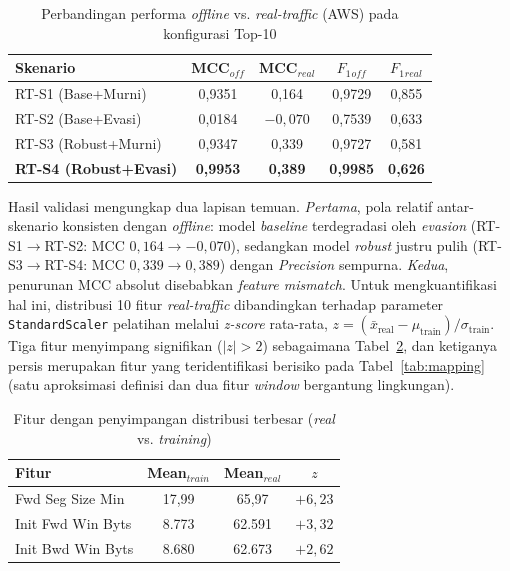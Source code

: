 \documentclass[10pt,twocolumn,a4paper]{extarticle}
\begin{document}
\begin{table}[htbp]
\caption{Perbandingan performa \textit{offline} vs. \textit{real-traffic} (AWS) pada konfigurasi Top-10}
\label{tab:real_traffic_results}
\centering
\footnotesize
\begin{tabularx}{\linewidth}{@{} X c c c c @{}}
\toprule
\textbf{Skenario} & \textbf{MCC$_{off}$} & \textbf{MCC$_{real}$} & \textbf{$F_1{}_{off}$} & \textbf{$F_1{}_{real}$} \\ \midrule
RT-S1 (Base+Murni) & 0,9351 & 0,164 & 0,9729 & 0,855 \\
RT-S2 (Base+Evasi) & 0,0184 & $-0{,}070$ & 0,7539 & 0,633 \\
RT-S3 (Robust+Murni) & 0,9347 & 0,339 & 0,9727 & 0,581 \\
\textbf{RT-S4 (Robust+Evasi)} & \textbf{0,9953} & \textbf{0,389} & \textbf{0,9985} & \textbf{0,626} \\ \bottomrule
\end{tabularx}
\end{table}

Hasil validasi mengungkap dua lapisan temuan. \textit{Pertama}, pola relatif antar-skenario konsisten dengan \textit{offline}: model \textit{baseline} terdegradasi oleh \textit{evasion} (RT-S1$\rightarrow$RT-S2: MCC $0{,}164 \rightarrow -0{,}070$), sedangkan model \textit{robust} justru pulih (RT-S3$\rightarrow$RT-S4: MCC $0{,}339 \rightarrow 0{,}389$) dengan \textit{Precision} sempurna. \textit{Kedua}, penurunan MCC absolut disebabkan \textit{feature mismatch}. Untuk mengkuantifikasi hal ini, distribusi 10 fitur \textit{real-traffic} dibandingkan terhadap parameter \texttt{StandardScaler} pelatihan melalui \textit{z-score} rata-rata, $z = (\bar{x}_{\text{real}} - \mu_{\text{train}}) / \sigma_{\text{train}}$. Tiga fitur menyimpang signifikan ($|z| > 2$) sebagaimana Tabel~\ref{tab:diag}, dan ketiganya persis merupakan fitur yang teridentifikasi berisiko pada Tabel~\ref{tab:mapping} (satu aproksimasi definisi dan dua fitur \textit{window} bergantung lingkungan).

\begin{table}[htbp]
\caption{Fitur dengan penyimpangan distribusi terbesar (\textit{real} vs. \textit{training})}
\label{tab:diag}
\centering
\footnotesize
\begin{tabularx}{\linewidth}{@{} X c c c @{}}
\toprule
\textbf{Fitur} & \textbf{Mean$_{train}$} & \textbf{Mean$_{real}$} & \textbf{$z$} \\ \midrule
Fwd Seg Size Min & 17,99 & 65,97 & $+6{,}23$ \\
Init Fwd Win Byts & 8.773 & 62.591 & $+3{,}32$ \\
Init Bwd Win Byts & 8.680 & 62.673 & $+2{,}62$ \\ \bottomrule
\end{tabularx}
\end{table}
\end{document}
